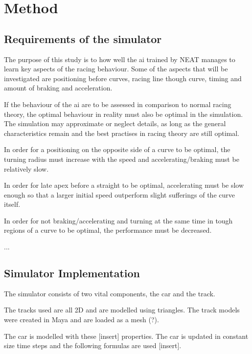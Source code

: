 
\chapter{Method}

\section{Requirements of the simulator}

The purpose of this study is to how well the ai trained by NEAT manages to learn key aspects of the racing behaviour.  Some of the aspects that will be investigated are positioning before curves, racing line though curve, timing and amount of braking and acceleration.

If the behaviour of the ai are to be assessed in comparison to normal racing theory, the optimal behaviour in reality must also be optimal in the simulation. The simulation may approximate or neglect details, as long as the general characteristics remain and the best practises in racing theory are still optimal.

In order for a positioning on the opposite side of a curve to be optimal, the turning radius must increase with the speed and accelerating/braking must be relatively slow.

In order for late apex before a straight to be optimal, accelerating must be slow enough so that a larger initial speed outperform slight sufferings of the curve itself.

In order for not braking/accelerating and turning at the same time in tough regions of a curve to be optimal, the performance must be decreased.

...


\section{Simulator Implementation}

The simulator consists of two vital components, the car and the track.

The tracks used are all 2D and are modelled using triangles. The track models were created in Maya and are loaded as a mesh (?).

The car is modelled with these [insert] properties. The car is updated in constant size time steps and the following formulas are used [insert].

